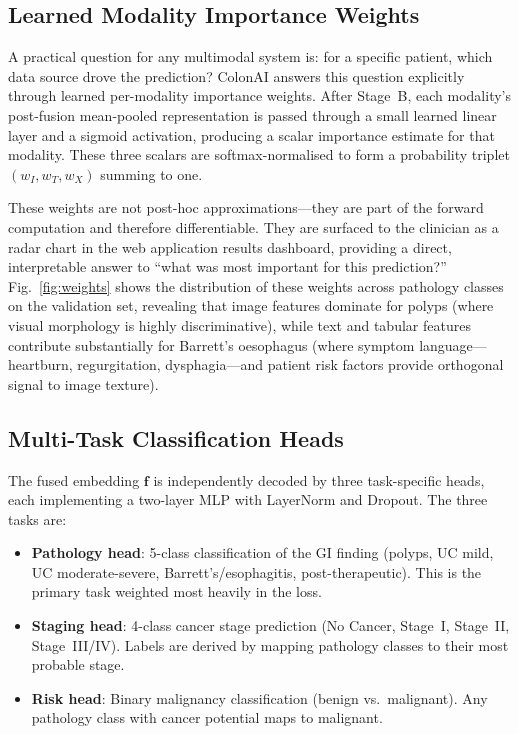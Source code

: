 \documentclass[conference]{IEEEtran}
\begin{document}
\subsection{Learned Modality Importance Weights}

A practical question for any multimodal system is: for a specific patient,
which data source drove the prediction? ColonAI answers this question
explicitly through learned per-modality importance weights. After Stage~B,
each modality's post-fusion mean-pooled representation is passed through
a small learned linear layer and a sigmoid activation, producing a scalar
importance estimate for that modality. These three scalars are softmax-normalised
to form a probability triplet $(w_I, w_T, w_X)$ summing to one.

These weights are not post-hoc approximations---they are part of the forward
computation and therefore differentiable. They are surfaced to the clinician
as a radar chart in the web application results dashboard, providing a
direct, interpretable answer to ``what was most important for this prediction?''
Fig.~\ref{fig:weights} shows the distribution of these weights across pathology
classes on the validation set, revealing that image features dominate for
polyps (where visual morphology is highly discriminative), while text and
tabular features contribute substantially for Barrett's oesophagus (where
symptom language---heartburn, regurgitation, dysphagia---and patient risk
factors provide orthogonal signal to image texture).

\subsection{Multi-Task Classification Heads}

The fused embedding $\mathbf{f}$ is independently decoded by three task-specific
heads, each implementing a two-layer MLP with LayerNorm and Dropout. The three
tasks are:

\begin{itemize}
  \item \textbf{Pathology head}: 5-class classification of the GI finding
        (polyps, UC mild, UC moderate-severe, Barrett's/esophagitis,
        post-therapeutic). This is the primary task weighted most heavily
        in the loss.
  \item \textbf{Staging head}: 4-class cancer stage prediction (No Cancer,
        Stage~I, Stage~II, Stage~III/IV). Labels are derived by mapping
        pathology classes to their most probable stage.
  \item \textbf{Risk head}: Binary malignancy classification (benign vs.\
        malignant). Any pathology class with cancer potential maps to
        malignant.
\end{itemize}
\end{document}
